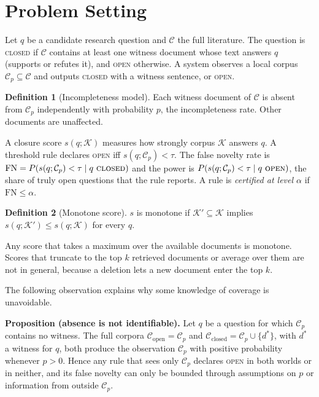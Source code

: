 \documentclass[conference,a4paper]{IEEEtran}
\theoremstyle{definition}
\newtheorem{definition}{Definition}
\newcommand{\open}{\textup{\textsc{open}}}
\newcommand{\closed}{\textup{\textsc{closed}}}
\begin{document}
\section{Problem Setting}
Let $q$ be a candidate research question and $\mathcal{C}$ the full literature. The question is \closed{} if $\mathcal{C}$ contains at least one witness document whose text answers $q$ (supports or refutes it), and \open{} otherwise. A system observes a local corpus $\mathcal{C}_p \subseteq \mathcal{C}$ and outputs \closed{} with a witness sentence, or \open{}.

\begin{definition}[Incompleteness model]
Each witness document of $\mathcal{C}$ is absent from $\mathcal{C}_p$ independently with probability $p$, the incompleteness rate. Other documents are unaffected.
\end{definition}

A closure score $s(q;\mathcal{K})$ measures how strongly corpus $\mathcal{K}$ answers $q$. A threshold rule declares \open{} iff $s(q;\mathcal{C}_p) < \tau$. The false novelty rate is $\mathrm{FN} = P(s(q;\mathcal{C}_p)<\tau \mid q\ \closed)$ and the power is $P(s(q;\mathcal{C}_p)<\tau \mid q\ \open)$, the share of truly open questions that the rule reports. A rule is \emph{certified at level $\alpha$} if $\mathrm{FN}\le\alpha$.

\begin{definition}[Monotone score]
$s$ is monotone if $\mathcal{K}'\subseteq\mathcal{K}$ implies $s(q;\mathcal{K}')\le s(q;\mathcal{K})$ for every $q$.
\end{definition}
Any score that takes a maximum over the available documents is monotone. Scores that truncate to the top $k$ retrieved documents or average over them are not in general, because a deletion lets a new document enter the top $k$.

The following observation explains why some knowledge of coverage is unavoidable.

\textbf{Proposition (absence is not identifiable).} Let $q$ be a question for which $\mathcal{C}_p$ contains no witness. The full corpora $\mathcal{C}_{\mathrm{open}}=\mathcal{C}_p$ and $\mathcal{C}_{\mathrm{closed}}=\mathcal{C}_p\cup\{d^*\}$, with $d^*$ a witness for $q$, both produce the observation $\mathcal{C}_p$ with positive probability whenever $p>0$. Hence any rule that sees only $\mathcal{C}_p$ declares \open{} in both worlds or in neither, and its false novelty can only be bounded through assumptions on $p$ or information from outside $\mathcal{C}_p$.
\end{document}

